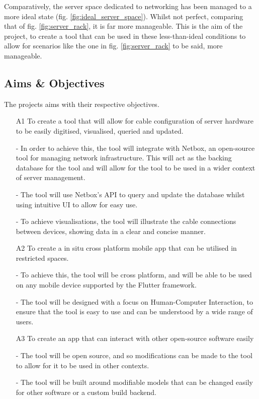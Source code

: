 \documentclass [11pt,a4paper]{article}
\begin{document}
\pagebreak
Comparatively, the server space dedicated to networking has been managed to a more ideal state (fig. \ref{fig:ideal_server_space}). Whilst not perfect, comparing that of fig. \ref{fig:server_rack}, it is far more manageable. This is the aim of the project, to create a tool that can be used in these less-than-ideal conditions to allow for scenarios like the one in fig. \ref{fig:server_rack} to be said, more manageable.

\subsection{Aims \& Objectives}
\label{sec:objectives}
The projects aims with their respective objectives.
\begin{enumerate} 
    

    \item[A1] To create a tool that will allow for cable configuration of server hardware to be
    easily digitised, visualised, queried and updated. 
        
        - In order to achieve this, the tool will integrate with Netbox, an open-source tool for managing network infrastructure. This will act as the backing database for the tool and will allow for the tool to be used in a wider context of server management.
        
        - The tool will use Netbox's API to query and update the database whilst using intuitive UI to allow for easy use.
        
        - To achieve visualisations, the tool will illustrate the cable connections between devices, showing data in a clear and concise manner.

    \item[A2] To create a in situ cross platform mobile app that can be utilised in restricted
    spaces.    

        - To achieve this, the tool will be cross platform, and will be able to be used on any mobile device supported by the Flutter framework.
        
        - The tool will be designed with a focus on Human-Computer Interaction, to ensure that the tool is easy to use and can be understood by a wide range of users.

    \item[A3] To create an app that can interact with other open-source software easily
    
        - The tool will be open source, and so modifications can be made to the tool to allow for it to be used in other contexts.
        
        - The tool will be built around modifiable models that can be changed easily for other software or a custom build backend.

\end{enumerate}
\pagebreak
\end{document}
